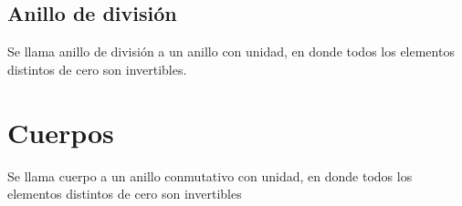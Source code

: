 \documentclass{article}
\begin{document}
\subsection{Anillo de división}
Se llama anillo de división a un anillo con unidad, en donde todos los elementos distintos de cero son invertibles.
\section{Cuerpos}
Se llama cuerpo a un anillo conmutativo con unidad, en donde todos los elementos distintos de cero son invertibles
\end{document}
